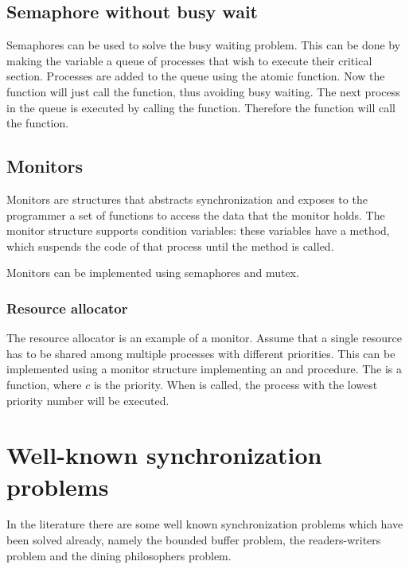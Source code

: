 \subsection{Semaphore without busy wait}
Semaphores can be used to solve the busy waiting problem. This can be done by making the variable  a queue of processes that wish to execute their critical section. Processes are added to the queue using the  atomic function. Now the  function will just call the  function, thus avoiding busy waiting. The next process in the queue is executed by calling the  function. Therefore the  function will call the  function.

\subsection{Monitors}
Monitors are structures that abstracts synchronization and exposes to the programmer a set of functions to access the data that the monitor holds. 
The monitor structure supports condition variables: these variables have a  method, which suspends the code of that process until the  method is called.


Monitors can be implemented using semaphores and mutex.

\subsubsection{Resource allocator}
The resource allocator is an example of a monitor. Assume that a single resource has to be shared among multiple processes with different priorities. This can be implemented using a monitor structure implementing an  and  procedure. The  is a  function, where $c$ is the priority. When  is called, the process with the lowest priority number will be executed.

\section{Well-known synchronization problems}
In the literature there are some well known synchronization problems which have been solved already, namely the bounded buffer problem, the readers-writers problem and the dining philosophers problem.

